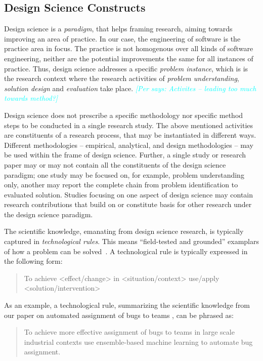 \documentclass[graybox]{svmult}
\newcommand{\per}[1]{\textcolor{cyan}{{\it [Per says: #1]}}}
\newcommand{\per}[1]{}
\begin{document}
\subsection{Design Science Constructs}

Design science is a \emph{paradigm}, that helps framing research, aiming towards improving an area of practice. In our case, the engineering of software is the practice area in focus. The practice is not homogenous over all kinds of software engineering, neither are the potential improvements the same for all instances of practice. Thus, design science addresses a specific \emph{problem instance}, which is is the research context where the research activities of \emph{problem understanding}, \emph{solution design} and \emph{evaluation} take place. \per{Activites -- leading too much towards method?}

Design science does not prescribe a specific methodology nor specific method steps to be conducted in a single research study. The above mentioned activities are constituents of  a research process, that may be instantiated in different ways. Different methodologies -- empirical, analytical, and  design methodologies -- may be used within the frame of design science. Further, a single study or research paper may or may not contain all the constituents of the design science paradigm; one study may be focused on, for example,  problem understanding only, another may report the complete chain from problem identification to evaluated solution. Studies focusing on one aspect of design science may contain research contributions that build on or constitute basis for other research under the design science paradigm.

The scientific knowledge, emanating from design science research, is typically captured in \emph{technological rules}. This means ``field-tested and grounded'' examplars of how a problem can be solved~\cite{van_aken_management_2004}. A technological rule is typically expressed in the following form: 

\begin{quote}{To achieve <effect/change> in <situation/context> use/apply <solution/intervention>}\end{quote}

As an example, a technological rule, summarizing the scientific knowledge from our paper on automated assignment of bugs to teams \cite{JonssonBug15}, can be phrased as:
\begin{quote}{To achieve more effective assignment of bugs to teams in large scale industrial contexts use ensemble-based machine learning to automate bug assignment. \cite{StoreyESEM17}}\end{quote}
\end{document}
